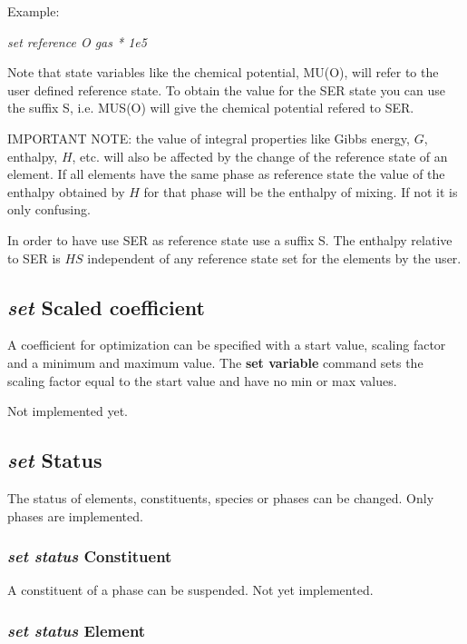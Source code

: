 \documentclass[11pt]{article}
\begin{document}
Example:

{\em set reference O gas * 1e5}

Note that state variables like the chemical potential, MU(O), will
refer to the user defined reference state.  To obtain the value for
the SER state you can use the suffix S, i.e. MUS(O) will give the
chemical potential refered to SER.

IMPORTANT NOTE: the value of integral properties like Gibbs energy,
$G$, enthalpy, $H$, etc. will also be affected by the change of the
reference state of an element.  If all elements have the same phase as
reference state the value of the enthalpy obtained by $H$ for that
phase will be the enthalpy of mixing.  If not it is only confusing.

In order to have use SER as reference state use a suffix S.  The
enthalpy relative to SER is $HS$ independent of any reference state
set for the elements by the user.

\hypertarget{Set scaled coefficient}{}
\subsection{{\em set} Scaled coefficient}

A coefficient for optimization can be specified with a start value,
scaling factor and a minimum and maximum value.  The {\bf set
  variable} command sets the scaling factor equal to the start value
and have no min or max values.

Not implemented yet.

\hypertarget{Set status}{}
\subsection{{\em set} Status}

The status of elements, constituents, species or phases can be
changed.  Only phases are implemented.

\hypertarget{Set status constituent}{}
\subsubsection{{\em set status} Constituent}

A constituent of a phase can be suspended.  Not yet implemented.

\hypertarget{Set status element}{}
\subsubsection{{\em set status} Element}
\end{document}
